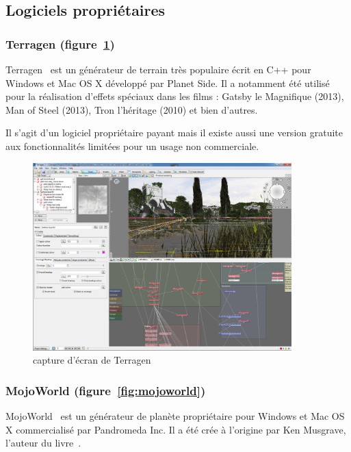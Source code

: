 \newpage
\subsection{Logiciels propriétaires}
\subsubsection{Terragen (figure~\ref{fig:terragen})}
Terragen~\cite{Terragen} est un générateur de terrain très populaire écrit en C++  pour Windows et Mac OS X développé par Planet Side. Il a notamment été utilisé pour la réalisation d'effets spéciaux dans les films : Gatsby le Magnifique (2013), Man of Steel (2013), Tron l'héritage (2010) et bien d'autres.

Il s'agit d'un logiciel propriétaire payant mais il existe aussi une version gratuite aux fonctionnalités limitées pour un usage non commerciale.

\begin{figure}[!ht]
    \begin{center}
        \includegraphics[width=10cm]{resources/terragen.jpg}
        \caption{capture d'écran de Terragen}
        \label{fig:terragen}
    \end{center}
\end{figure}

\subsubsection{MojoWorld (figure~\ref{fig:mojoworld})}
MojoWorld~\cite{Mojoworld} est un générateur de planète propriétaire pour Windows et Mac OS X
commercialisé par Pandromeda Inc.
Il a été crée à l'origine par Ken Musgrave, l'auteur du livre~\cite{Eber02}.

